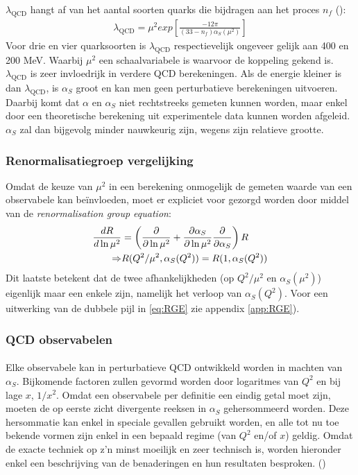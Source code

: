 \documentclass[a4paper,11pt]{article}
\numberwithin{equation}{section} %
\begin{document}
$\lambda_\text{QCD}$ hangt af van het aantal soorten quarks die bijdragen aan het proces $n_f$ (\cite[sectie 6.6]{Bettini}):
\begin{align}
\lambda_\text{QCD} = \mu^2 exp \left[ \frac{-12\pi}{(33-n_f) \alpha_S(\mu^2)} \right]
\end{align}
Voor drie en vier quarksoorten is $\lambda_\text{QCD}$ respectievelijk ongeveer gelijk aan 400 en 200 MeV.
Waarbij $\mu^2$ een schaalvariabele is waarvoor de koppeling gekend is.
$\lambda_\text{QCD}$ is zeer invloedrijk in verdere QCD berekeningen.
Als de energie kleiner is dan $\lambda_\text{QCD}$, is $\alpha_S$ groot en kan men geen perturbatieve berekeningen uitvoeren.
Daarbij komt dat $\alpha$ en $\alpha_S$ niet rechtstreeks gemeten kunnen worden, maar enkel door een theoretische berekening uit experimentele data kunnen worden afgeleid.
$\alpha_S$ zal dan bijgevolg minder nauwkeurig zijn, wegens zijn relatieve grootte.

    \subsubsection{Renormalisatiegroep vergelijking}
Omdat de keuze van $\mu^2$ in een berekening onmogelijk de gemeten waarde van een observabele kan beïnvloeden, moet er expliciet voor gezorgd worden door middel van de \textit{renormalisation group equation}:
\begin{align} \label{eq:RGE}
\frac{d R}{d\ln{\mu^2}} &= \left(\frac{\partial}{\partial \ln{\mu^2}} + \frac{\partial \alpha_S}{\partial \ln{\mu^2}} \frac{\partial}{\partial \alpha_S} \right) R \\
\Rightarrow &R(Q^2/\mu^2, \alpha_S(Q^2)) = R(1,\alpha_S(Q^2)) \notag
\end{align}
Dit laatste betekent dat de twee afhankelijkheden (op $Q^2/\mu^2$ en $\alpha_S(\mu^2)$) eigenlijk maar een enkele zijn, namelijk het verloop van $\alpha_S(Q^2)$. Voor een uitwerking van de dubbele pijl in \eqref{eq:RGE} zie appendix \ref{app:RGE}).

    \subsubsection{QCD observabelen} \label{sec:Observabelen}
      \paragraph{}
Elke observabele kan in perturbatieve QCD ontwikkeld worden in machten van $\alpha_S$.
Bijkomende factoren zullen gevormd worden door logaritmes van $Q^2$ en bij lage $x$, $1/x^2$.
Omdat een observabele per definitie een eindig getal moet zijn, moeten de op eerste zicht divergente reeksen in $\alpha_S$ gehersommeerd worden.
Deze hersommatie kan enkel in speciale gevallen gebruikt worden, en alle tot nu toe bekende vormen zijn enkel in een bepaald regime (van $Q^2$ en/of $x$) geldig.
Omdat de exacte techniek op z’n minst moeilijk en zeer technisch is, worden hieronder enkel een beschrijving van de benaderingen en hun resultaten besproken. (\cite[sectie 9.5.2]{Barone})
\end{document}
